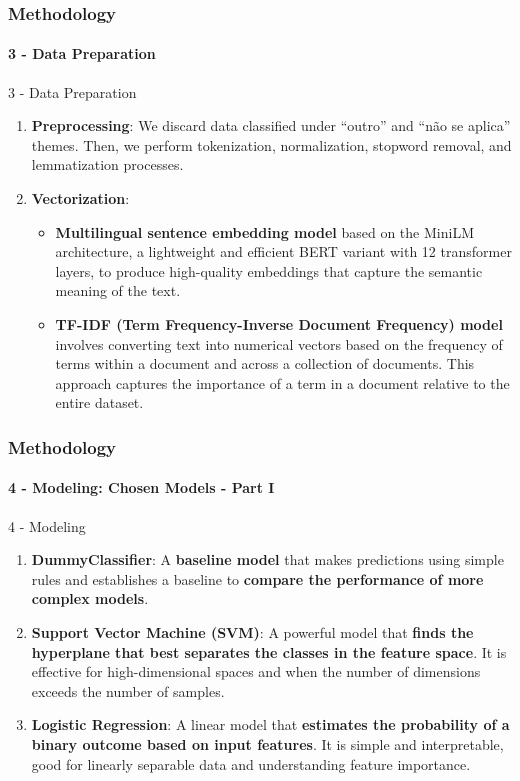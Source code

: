 \begin{frame}
	\frametitle{Methodology}
	\framesubtitle{3 - Data Preparation}	

	\begin{block}{3 - Data Preparation} 
		\begin{enumerate}

			\item \textbf{Preprocessing}: We discard data classified under ``outro'' and ``não se aplica'' themes. Then, we perform tokenization, normalization, stopword removal, and lemmatization processes.
			
			\item \textbf{Vectorization}:
			\begin{itemize}
				\item \textbf{Multilingual sentence embedding model} based on the MiniLM architecture, a lightweight and efficient BERT variant with 12 transformer layers, to produce high-quality embeddings that capture the semantic meaning of the text. 
				
				\item \textbf{TF-IDF (Term Frequency-Inverse Document Frequency) model} involves converting text into numerical vectors based on the frequency of terms within a document and across a collection of documents. This approach captures the importance of a term in a document relative to the entire dataset.
			\end{itemize}
		\end{enumerate}
	\end{block}
\end{frame}
\begin{frame}
	\frametitle{Methodology}
	\framesubtitle{4 - Modeling: Chosen Models - Part I}	
	
	\begin{block}{4 - Modeling} 
		\begin{enumerate}
			\item \textbf{DummyClassifier}: A \textbf{baseline model} that makes predictions using simple rules and establishes a baseline to \textbf{compare the performance of more complex models}.
			
			\item \textbf{Support Vector Machine (SVM)}: A powerful model that \textbf{finds the hyperplane that best separates the classes in the feature space}. It is  effective for high-dimensional spaces and when the number of dimensions exceeds the number of samples.
			
			\item \textbf{Logistic Regression}: A linear model that \textbf{estimates the probability of a binary outcome based on input features}. It is simple and interpretable, good for linearly separable data and understanding feature importance.
		\end{enumerate}
	\end{block}
\end{frame}
